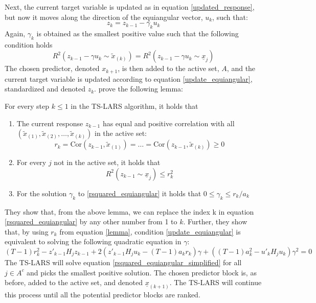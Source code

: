 Next, the current target variable is updated as in equation \eqref{updated_response}, but now it moves along the direction of the equiangular vector, $u_k$, such that:
\begin{equation}\label{update_equiangular}
	z_k = z_{k - 1} - \gamma_k u_k
\end{equation}
\noindent Again, $\gamma_k$ is obtained as the smallest positive value such that the following condition holds
\begin{equation}\label{rsquared_equiangular}
	R^2(z_{k - 1} - \gamma u_k \sim \tilde{x}_{(k)}) = R^2(z_{k - 1} - \gamma u_k \sim \underline{x}_j)
\end{equation}
\noindent The chosen predictor, denoted $x_{k + 1}$, is then added to the active set, $A$, and the current target variable is updated according to equation \eqref{update_equiangular}, standardized and denoted $z_k$. \textcite{gelper2008} prove the following lemma:

\begin{lemma}
For every step $k \leq 1$ in the TS-LARS algorithm, it holds that
\begin{enumerate}
\item The current response $z_{k - 1}$ has equal and positive correlation with all
\newline $(\tilde{x}_{(1)}, \tilde{x}_{(2)}, \ldots, \tilde{x}_{(k)})$ in the active set:
\begin{equation}\label{lemma}
r_k = \text{Cor}(z_{k - 1}, \tilde{x}_{(1)}) = \ldots = \text{Cor}(z_{k - 1}, \tilde{x}_{(k)}) \geq 0
\end{equation}
\item For every $j$ not in the active set, it holds that
$$R^2(z_{k-1}\sim \underline{x}_j) \leq r_k^2$$
\item For the solution $\gamma_k$ to \eqref{rsquared_equiangular} it holds that $0 \leq \gamma_k \leq r_k / a_k$
\end{enumerate}
\end{lemma}
\noindent They show that, from the above lemma, we can replace the index k in equation \eqref{rsquared_equiangular} by any other number from 1 to $k$. Further, they show that, by using $r_k$ from equation \eqref{lemma}, condition \eqref{update_equiangular} is equivalent to solving the following quadratic equation in $\gamma$:
\begin{equation}\label{rsquared_equiangular_simplified}
	(T - 1) r_k^2 - z'_{k - 1} H_j z_{k - 1} + 2(z'_{k - 1} H_j u_k - (T - 1) a_k r_k) \gamma + ((T - 1) a_k^2 - u'_k H_j u_k) \gamma^2 = 0
\end{equation}
\noindent The TS-LARS will solve equation \eqref{rsquared_equiangular_simplified} for all $j \in A^c$ and picks the smallest positive solution. The chosen predictor block is, as before, added to the active set, and denoted $\underline{x}_{(k + 1)}$. The TS-LARS will continue this process until all the potential predictor blocks are ranked.




